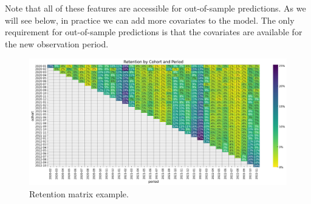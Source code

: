 \documentclass[11pt]{amsart}
\theoremstyle{definition}
\begin{document}
Note that all of these features are accessible for out-of-sample predictions.
As we will see below, in practice we can add more covariates to the model.
The only requirement for out-of-sample predictions is that the covariates are available
for the new observation period. \\

\begin{figure}
    \centering
    \includegraphics[width=\textwidth]{images/revenue_retention_17_0.png}
    \caption{Retention matrix example.}
    \label{fig:retention_matrix}
\end{figure}
\end{document}
